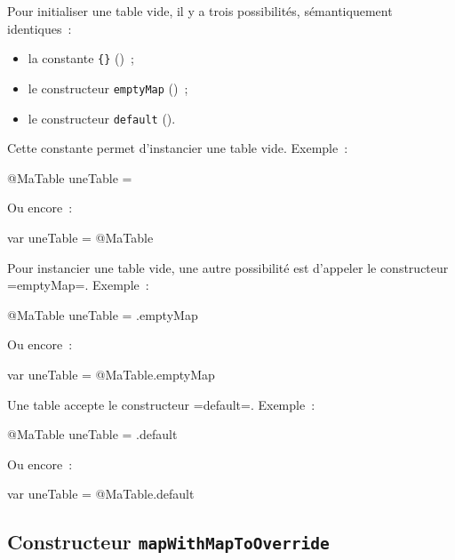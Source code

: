 Pour initialiser une table vide, il y a trois possibilités, sémantiquement identiques~:
\begin{itemize}
  \item la constante \texttt{\{\}} ()~;
  \item le constructeur \texttt{emptyMap} ()~;
  \item le constructeur \texttt{default} ().
\end{itemize}



Cette constante permet d'instancier une table vide. Exemple~:
\begin{galgas3}
@MaTable uneTable = {}
\end{galgas3}

Ou encore~:

\begin{galgas3}
var uneTable = @MaTable {}
\end{galgas3}


Pour instancier une table vide, une autre possibilité est d'appeler le constructeur \ggst=emptyMap=. Exemple~:
\begin{galgas3}
@MaTable uneTable = .emptyMap
\end{galgas3}

Ou encore~:

\begin{galgas3}
var uneTable = @MaTable.emptyMap
\end{galgas3}





Une table accepte le constructeur \ggst=default=. Exemple~:
\begin{galgas3}
@MaTable uneTable = .default
\end{galgas3}

Ou encore~:

\begin{galgas3}
var uneTable = @MaTable.default
\end{galgas3}



\subsection{Constructeur \texttt{mapWithMapToOverride}}

